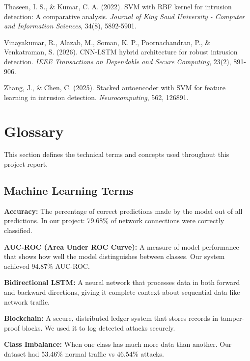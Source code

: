 \documentclass[12pt,a4paper]{report}
\begin{document}
\begin{enumerate}[label={[\arabic*]}, leftmargin=*, itemsep=0.5em]
\item Thaseen, I. S., \& Kumar, C. A. (2022). SVM with RBF kernel for intrusion detection: A comparative analysis. \textit{Journal of King Saud University - Computer and Information Sciences}, 34(8), 5892-5901.

\item Vinayakumar, R., Alazab, M., Soman, K. P., Poornachandran, P., \& Venkatraman, S. (2026). CNN-LSTM hybrid architecture for robust intrusion detection. \textit{IEEE Transactions on Dependable and Secure Computing}, 23(2), 891-906.

\item Zhang, J., \& Chen, C. (2025). Stacked autoencoder with SVM for feature learning in intrusion detection. \textit{Neurocomputing}, 562, 126891.

\end{enumerate}

\chapter{Glossary}

This section defines the technical terms and concepts used throughout this project report.

\section{Machine Learning Terms}

\textbf{Accuracy:} The percentage of correct predictions made by the model out of all predictions. In our project: 79.68\% of network connections were correctly classified.

\textbf{AUC-ROC (Area Under ROC Curve):} A measure of model performance that shows how well the model distinguishes between classes. Our system achieved 94.87\% AUC-ROC.

\textbf{Bidirectional LSTM:} A neural network that processes data in both forward and backward directions, giving it complete context about sequential data like network traffic.

\textbf{Blockchain:} A secure, distributed ledger system that stores records in tamper-proof blocks. We used it to log detected attacks securely.

\textbf{Class Imbalance:} When one class has much more data than another. Our dataset had 53.46\% normal traffic vs 46.54\% attacks.
\end{document}
